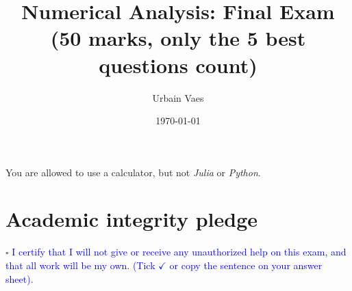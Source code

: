 \documentclass[11pt]{article}
\theoremstyle{definition}
\theoremstyle{remark}
\theoremstyle{plain}%
\begin{document}
\title{Numerical Analysis: Final Exam \\
\small{(\textbf{50 marks}, only the 5 best questions count)}}
\author{Urbain Vaes}
\date{\today}
\maketitle

\noindent You are allowed to use a calculator, but not \emph{Julia} or \emph{Python}.

\section*{Academic integrity pledge}
\noindent $\square$ \textcolor{blue}{I certify that I will not give or receive any unauthorized help on this exam,
and that all work will be my own. (Tick $\checkmark$ or copy the sentence on your answer sheet)}.
\end{document}
